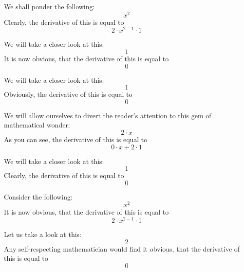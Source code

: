 \documentclass{article}
\begin{document}
We shall ponder the following:
\begin{equation}
x ^{2 } 
\end{equation}
Clearly, the derivative of this is equal to
\begin{equation}
2 \cdot x ^{2 - 1 } \cdot 1 
\end{equation}

We will take a closer look at this:
\begin{equation}
1 
\end{equation}
It is now obvious, that the derivative of this is equal to
\begin{equation}
0 
\end{equation}

We will take a closer look at this:
\begin{equation}
1 
\end{equation}
Obviously, the derivative of this is equal to
\begin{equation}
0 
\end{equation}

We will allow ourselves to divert the reader's attention to this gem of mathematical wonder:
\begin{equation}
2 \cdot x 
\end{equation}
As you can see, the derivative of this is equal to
\begin{equation}
0 \cdot x + 2 \cdot 1 
\end{equation}

We will take a closer look at this:
\begin{equation}
1 
\end{equation}
Clearly, the derivative of this is equal to
\begin{equation}
0 
\end{equation}

Consider the following:
\begin{equation}
x ^{2 } 
\end{equation}
It is now obvious, that the derivative of this is equal to
\begin{equation}
2 \cdot x ^{2 - 1 } \cdot 1 
\end{equation}

Let us take a look at this:
\begin{equation}
2 
\end{equation}
Any self-respecting mathematician would find it obvious, that the derivative of this is equal to
\begin{equation}
0 
\end{equation}
\end{document}
